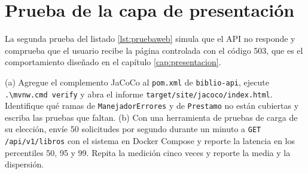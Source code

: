 \section{Prueba de la capa de presentación}



La segunda prueba del listado \ref{lst:pruebaweb} simula que el API no responde y comprueba que el usuario recibe la página controlada con el código 503, que es el comportamiento diseñado en el capítulo \ref{cap:presentacion}.

\begin{practicaBox}[title={Práctica 9.1: medir la cobertura y probar la carga}]
	(a) Agregue el complemento JaCoCo al \texttt{pom.xml} de \texttt{biblio-api}, ejecute \texttt{.\textbackslash mvnw.cmd verify} y abra el informe \texttt{target/site/jacoco/index.html}. Identifique qué ramas de \texttt{ManejadorErrores} y de \texttt{Prestamo} no están cubiertas y escriba las pruebas que faltan. (b) Con una herramienta de pruebas de carga de su elección, envíe 50 solicitudes por segundo durante un minuto a \texttt{GET /api/v1/libros} con el sistema en Docker Compose y reporte la latencia en los percentiles 50, 95 y 99. Repita la medición cinco veces y reporte la media y la dispersión.
\end{practicaBox}
